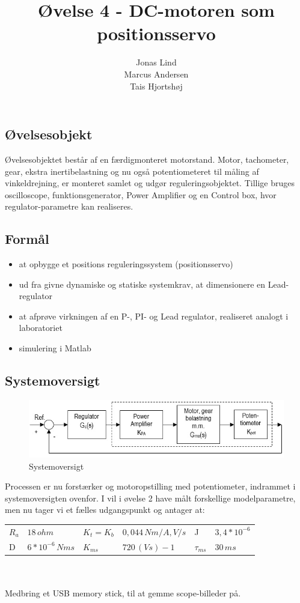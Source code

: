 \documentclass[]{report}
\title{Øvelse 4 - DC-motoren som positionsservo}
\author{Jonas Lind\\Marcus Andersen\\Tais Hjortshøj}
\begin{document}
\maketitle

\chapter{}
\section{Øvelsesobjekt}
Øvelsesobjektet består af en færdigmonteret motorstand. Motor, tachometer, gear, ekstra inertibelastning og nu også potentiometeret til måling af vinkeldrejning, er monteret samlet og udgør reguleringsobjektet. 
Tillige bruges oscilloscope, funktionsgenerator, Power Amplifier og en Control box, hvor regulator-parametre kan realiseres.

\section{Formål}
\begin{itemize}
	\item at opbygge et positions reguleringssystem (positionsservo)
	\item ud fra givne dynamiske og statiske systemkrav, at dimensionere en Lead-regulator
	\item at afprøve virkningen af en P-, PI- og Lead regulator, realiseret analogt i laboratoriet
	\item simulering i Matlab
\end{itemize}

\section{Systemoversigt}
\begin{figure}[h]
	\centering
	\includegraphics[width=1\linewidth]{graphics/systemoversigt}
	\caption{Systemoversigt}
	\label{fig:systemoversigt}
\end{figure}
\noindent Processen er nu forstærker og motoropstilling med potentiometer, indrammet i systemoversigten ovenfor. 
I vil i øvelse 2 have målt forskellige modelparametre, men nu tager vi et fælles udgangspunkt og antager at:\\
\newline
\begin{tabular}{llllll} 
	$R_{a}$ & $18 \,ohm$ & $K_{t} = K_{b}$ & $0,044 \,Nm/A, V/s$ & J & $3,4*10^{-6}$ \\ 
	D & $ 6*10^{-6} \,Nms$ & $K_{ms}$ &  $720 \,(Vs)-1$ & $\tau_{ms}$ & $30 \,ms$ \\ 
\end{tabular} \\ \\
\newline Medbring et USB memory stick, til at gemme scope-billeder på.
\end{document}
